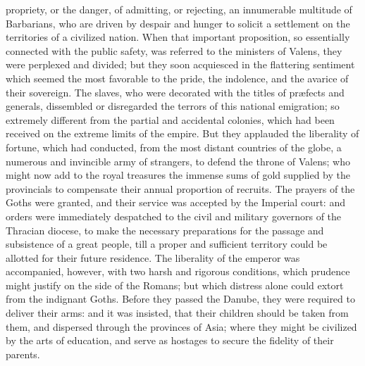 propriety, or the danger, of admitting, or rejecting, an
innumerable multitude of Barbarians, who are driven by despair
and hunger to solicit a settlement on the territories of a
civilized nation. When that important proposition, so essentially
connected with the public safety, was referred to the ministers
of Valens, they were perplexed and divided; but they soon
acquiesced in the flattering sentiment which seemed the most
favorable to the pride, the indolence, and the avarice of their
sovereign. The slaves, who were decorated with the titles of
præfects and generals, dissembled or disregarded the terrors of
this national emigration; so extremely different from the partial
and accidental colonies, which had been received on the extreme
limits of the empire. But they applauded the liberality of
fortune, which had conducted, from the most distant countries of
the globe, a numerous and invincible army of strangers, to defend
the throne of Valens; who might now add to the royal treasures
the immense sums of gold supplied by the provincials to
compensate their annual proportion of recruits. The prayers of
the Goths were granted, and their service was accepted by the
Imperial court: and orders were immediately despatched to the
civil and military governors of the Thracian diocese, to make the
necessary preparations for the passage and subsistence of a great
people, till a proper and sufficient territory could be allotted
for their future residence. The liberality of the emperor was
accompanied, however, with two harsh and rigorous conditions,
which prudence might justify on the side of the Romans; but which
distress alone could extort from the indignant Goths. Before they
passed the Danube, they were required to deliver their arms: and
it was insisted, that their children should be taken from them,
and dispersed through the provinces of Asia; where they might be
civilized by the arts of education, and serve as hostages to
secure the fidelity of their parents.




